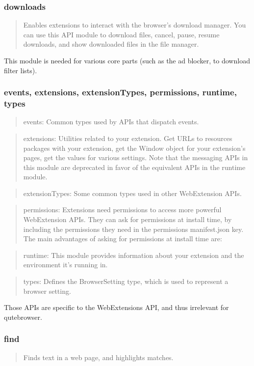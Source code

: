 \documentclass[a4paper,parskip=full]{scrreprt}
\begin{document}
\subsubsection{downloads}
\begin{quote}
Enables extensions to interact with the browser's download manager. You can use this API module to download files, cancel, pause, resume downloads, and show downloaded files in the file manager.
\end{quote}

This module is needed for various core parts (such as the ad blocker, to
download filter lists).

\subsubsection{events, extensions, extensionTypes, permissions, runtime, types}
\begin{quote}
events: Common types used by APIs that dispatch events.
\end{quote}
\begin{quote}
extensions: Utilities related to your extension. Get URLs to resources packages with your extension, get the Window object for your extension's pages, get the values for various settings. Note that the messaging APIs in this module are deprecated in favor of the equivalent APIs in the runtime module.
\end{quote}
\begin{quote}
extensionTypes: Some common types used in other WebExtension APIs.
\end{quote}
\begin{quote}
permissions: Extensions need permissions to access more powerful WebExtension APIs. They can ask for permissions at install time, by including the permissions they need in the permissions manifest.json key. The main advantages of asking for permissions at install time are:
\end{quote}
\begin{quote}
runtime: This module provides information about your extension and the environment it's running in.
\end{quote}
\begin{quote}
types: Defines the BrowserSetting type, which is used to represent a browser setting.
\end{quote}

Those APIs are specific to the WebExtensions API, and thus irrelevant for
qutebrowser.

\subsubsection{find}
\begin{quote}
Finds text in a web page, and highlights matches.
\end{quote}
\end{document}

